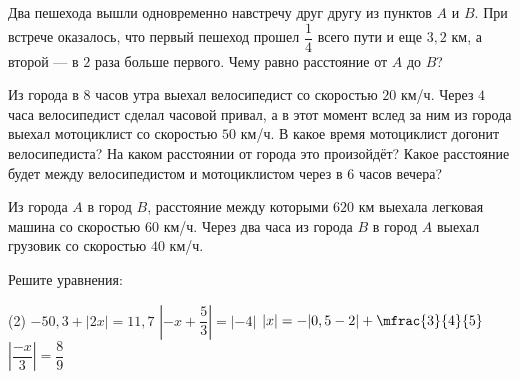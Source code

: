 \begin{homework}[number=4]
	\begin{listofex}
		\item Два пешехода вышли одновременно навстречу друг другу из пунктов \(A\) и \(B\). При встрече оказалось, что первый пешеход прошел \(\dfrac{ 1 }{ 4 }\) всего пути и еще \(3,2\) км, а второй --- в \(2\) раза больше первого. Чему равно расстояние от \(A\) до \(B\)?
		\item Из города в \(8\) часов утра выехал велосипедист со скоростью \(20\) км/ч. Через \(4\) часа велосипедист сделал часовой привал, а в этот момент вслед за ним из города выехал мотоциклист со скоростью \(50\) км/ч. В какое время мотоциклист догонит велосипедиста? На каком расстоянии от города это произойдёт? Какое расстояние будет между велосипедистом и мотоциклистом через в \(6\) часов вечера?
		\item Из города \(A\) в город \(B\), расстояние между которыми \(620\) км выехала легковая машина со скоростью \(60\) км/ч. Через два часа из города \(B\) в город \(A\) выехал грузовик со скоростью \(40\) км/ч.
		\item Решите уравнения:
		\begin{tasks}(2)
			\task \( -50,3+|2x|=11,7 \)
			\task \( \left| -x+\dfrac{ 5 }{ 3 } \right|=|-4| \)
			\task \( |x|=-|0,5-2|+\mfrac{3 }{4 }{5 } \)
			\task \( \left|\dfrac{ -x }{ 3 } \right|=\dfrac{ 8 }{ 9 } \)
		\end{tasks}
	\end{listofex}
\end{homework}
